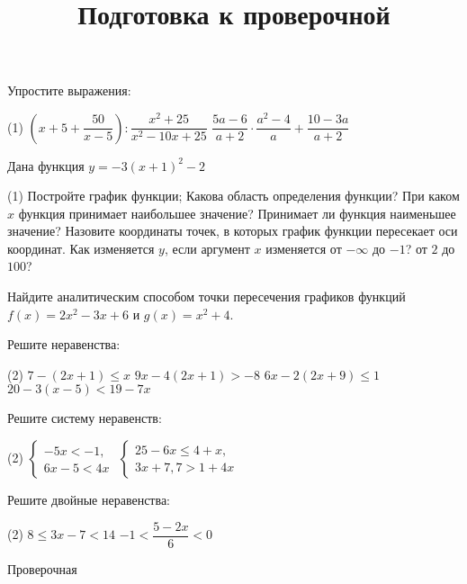 \begin{class}[number=7]
	\title{Подготовка к проверочной}
	\begin{listofex}
		\item Упростите выражения:
		\begin{tasks}(1)
			\task \( \left( x+5+\dfrac{50}{x-5} \right):\dfrac{x^2+25}{x^2-10x+25} \)
			\task \( \dfrac{5a-6}{a+2}\cdot\dfrac{a^2-4}{a}+\dfrac{10-3a}{a+2} \)
		\end{tasks}
		\item Дана функция \( y=-3(x+1)^2-2 \)
		\begin{tasks}(1)
			\task Постройте график функции;
			\task Какова область определения функции?
			\task При каком \( x \) функция принимает наибольшее значение? Принимает ли функция наименьшее значение?
			\task Назовите координаты точек, в которых график функции пересекает оси координат.
			\task Как изменяется \( y \), если аргумент \( x \) изменяется от \( -\infty  \) до \( -1 \)? от \( 2 \) до \( 100 \)?
		\end{tasks}
		\item Найдите аналитическим способом точки пересечения графиков функций \(f(x)=2x^2-3x+6\)	и \( g(x)=x^2+4 \).
		\item Решите неравенства:
		\begin{tasks}(2)
			\task \( 7-(2x+1)\leq x \)
			\task \( 9x-4(2x+1)>-8 \)
			\task \( 6x-2(2x+9)\leq1 \)
			\task \( 20-3(x-5)<19-7x \)
		\end{tasks}
		\item Решите систему неравенств:
		\begin{tasks}(2)
			\task \( \left\{
			\begin{array}{l}
				-5x<-1,\\
				6x-5<4x
			\end{array}
			\right. \)
			\task \( \left\{
			\begin{array}{l}
				25-6x\leq4+x,\\
				3x+7,7>1+4x
			\end{array}
			\right. \)
		\end{tasks}
		\item Решите двойные неравенства:
		\begin{tasks}(2)
			\task \( 8\leq3x-7<14 \)
			\task \( -1<\dfrac{5-2x}{6}<0 \)
		\end{tasks}
	\end{listofex}
\end{class}

\begin{exam}
	\begin{listofex}
		\item Проверочная
	\end{listofex}
\end{exam}
